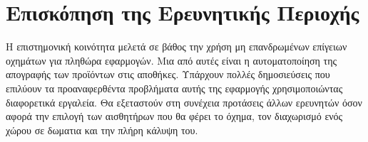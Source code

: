 \chapter{Επισκόπηση της Ερευνητικής Περιοχής}
\label{chapter:sota}

Η επιστημονική κοινότητα μελετά σε βάθος την χρήση μη επανδρωμένων επίγειων οχημάτων για πληθώρα εφαρμογών. Μια από αυτές είναι η αυτοματοποίηση της απογραφής των προϊόντων στις αποθήκες. Υπάρχουν πολλές δημοσιεύσεις που επιλύουν τα προαναφερθέντα προβλήματα αυτής της εφαρμογής χρησιμοποιώντας διαφορετικά εργαλεία. Θα εξεταστούν στη συνέχεια προτάσεις άλλων ερευνητών όσον αφορά την επιλογή των αισθητήρων που θα φέρει το όχημα, τον διαχωρισμό ενός χώρου σε δωματια και την πλήρη κάλυψη του.










